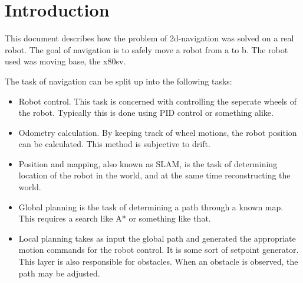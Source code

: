 \documentclass[a4paper]{article}
\begin{document}
\section{Introduction}
This document describes how the problem of 2d-navigation was solved on a real robot.
The goal of navigation is to safely move a robot from a to b. The robot used
was moving base, the x80sv.



The task of navigation can be split up into the following tasks:

\begin{itemize}
  \item Robot control. This task is concerned with controlling the seperate wheels of the robot. Typically this is done using PID control or something alike.
  \item Odometry calculation. By keeping track of wheel motions, the robot position can be
calculated. This method is subjective to drift.
  \item Position and mapping, also known as SLAM, is the task of determining location of the robot in the world, and at the same time reconstructing the world.
  \item Global planning is the task of determining a path through a known map. This requires a search like A* or something like that.
  \item Local planning takes as input the global path and generated the appropriate motion commands for the robot control. It is some sort of setpoint generator. This layer is also responsible for obstacles. When an obstacle is observed, the path may be adjusted.
\end{itemize}
\end{document}
